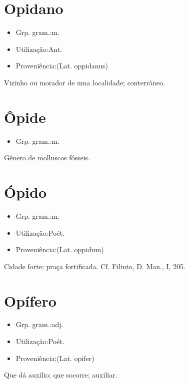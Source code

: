 \section{Opidano}
\begin{itemize}
\item {Grp. gram.:m.}
\end{itemize}
\begin{itemize}
\item {Utilização:Ant.}
\end{itemize}
\begin{itemize}
\item {Proveniência:(Lat. \textunderscore oppidanus\textunderscore )}
\end{itemize}
Vizinho ou morador de uma localidade; conterrâneo.
\section{Ôpide}
\begin{itemize}
\item {Grp. gram.:m.}
\end{itemize}
Gênero de molluscos fósseis.
\section{Ópido}
\begin{itemize}
\item {Grp. gram.:m.}
\end{itemize}
\begin{itemize}
\item {Utilização:Poét.}
\end{itemize}
\begin{itemize}
\item {Proveniência:(Lat. \textunderscore oppidum\textunderscore )}
\end{itemize}
Cidade forte; praça fortificada. Cf. Filinto, \textunderscore D. Man.\textunderscore , I, 205.
\section{Opífero}
\begin{itemize}
\item {Grp. gram.:adj.}
\end{itemize}
\begin{itemize}
\item {Utilização:Poét.}
\end{itemize}
\begin{itemize}
\item {Proveniência:(Lat. \textunderscore opifer\textunderscore )}
\end{itemize}
Que dá auxílio; que socorre; auxiliar.
